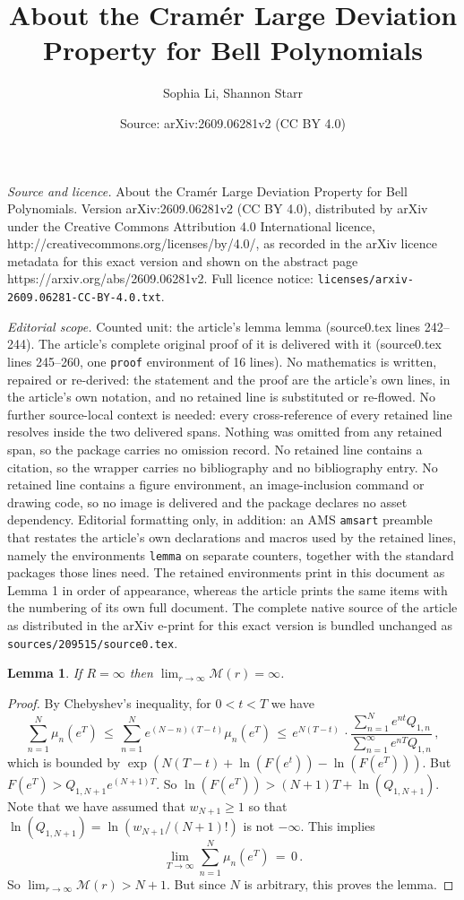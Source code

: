 \documentclass[10pt,a4paper]{amsart}
\title{About the Cram\'er Large Deviation Property for Bell Polynomials}
\author{Sophia Li, Shannon Starr}
\date{Source: arXiv:2609.06281v2 (CC BY 4.0)}
\newtheorem{lemma}{Lemma}
\begin{document}
\maketitle

\noindent\emph{Source and licence.} About the Cram\'er Large Deviation Property for Bell Polynomials. Version arXiv:2609.06281v2 (CC BY 4.0), distributed by arXiv under the Creative Commons Attribution 4.0 International licence, http://creativecommons.org/licenses/by/4.0/, as recorded in the arXiv licence metadata for this exact version and shown on the abstract page https://arxiv.org/abs/2609.06281v2. Full licence notice: \texttt{licenses/arxiv-2609.06281-CC-BY-4.0.txt}.\par\smallskip

\noindent\textit{Editorial scope.} Counted unit: the article's lemma lemma (source0.tex lines 242--244). The article's complete original proof of it is delivered with it (source0.tex lines 245--260, one \texttt{proof} environment of 16 lines). No mathematics is written, repaired or re-derived: the statement and the proof are the article's own lines, in the article's own notation, and no retained line is substituted or re-flowed.  No further source-local context is needed: every cross-reference of every retained line resolves inside the two delivered spans.  Nothing was omitted from any retained span, so the package carries no omission record.  No retained line contains a citation, so the wrapper carries no bibliography and no bibliography entry.  No retained line contains a figure environment, an image-inclusion command or drawing code, so no image is delivered and the package declares no asset dependency.  Editorial formatting only, in addition: an AMS \texttt{amsart} preamble that restates the article's own declarations and macros used by the retained lines, namely the environments \texttt{lemma} on separate counters, together with the standard packages those lines need.  The retained environments print in this document as Lemma 1 in order of appearance, whereas the article prints the same items with the numbering of its own full document.  The complete native source of the article as distributed in the arXiv e-print for this exact version is bundled unchanged as \texttt{sources/209515/source0.tex}.
\begin{lemma}
If $R=\infty$ then $\lim_{r \to \infty} \mathcal{M}(r)=\infty$.
\end{lemma}

\begin{proof}
By Chebyshev's inequality, for $0<t<T$ we have
$$
\sum_{n=1}^{N} \mu_n(e^T)\, \leq\, \sum_{n=1}^{N} e^{(N-n)(T-t)} \mu_{n}(e^T)\,
\leq\, e^{N(T-t)}\, \cdot 
\frac{\sum_{n=1}^{N} e^{nt} Q_{1,n}}{\sum_{n=1}^{\infty} e^{nT} Q_{1,n}}\, ,
$$
which is bounded by $\exp\left(N(T-t)+\ln(F(e^t))-\ln(F(e^T))\right)$.
But $F(e^T)>Q_{1,N+1} e^{(N+1)T}$. So $\ln(F(e^T))>(N+1)T+\ln(Q_{1,N+1})$.
Note that we have assumed that $w_{N+1}\geq 1$ so that $\ln(Q_{1,N+1})=\ln(w_{N+1}/(N+1)!)$ is not $-\infty$.
This implies
$$
\lim_{T \to \infty} \sum_{n=1}^{N} \mu_n(e^T)\, =\, 0\, .
$$
So $\lim_{r \to \infty} \mathcal{M}(r)>N+1$. But since $N$ is arbitrary, this proves the lemma.
\end{proof}
\end{document}
